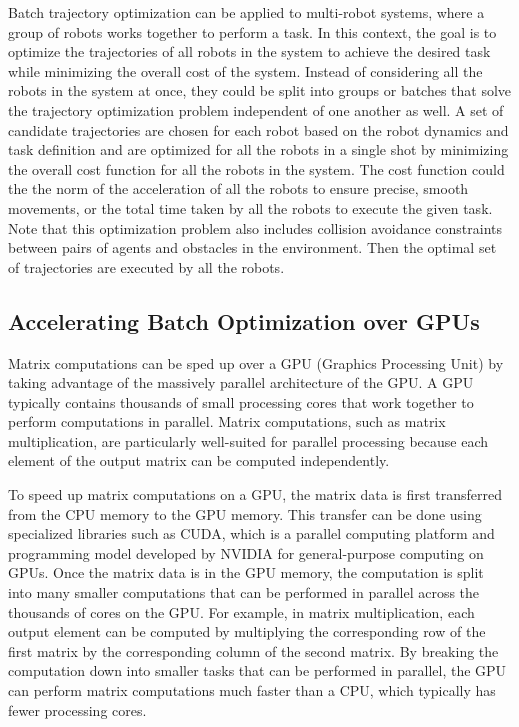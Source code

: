 Batch trajectory optimization can be applied to multi-robot systems, where a group of robots works together to perform a task. In this context, the goal is to optimize the trajectories of all robots in the system to achieve the desired task while minimizing the overall cost of the system. Instead of considering all the robots in the system at once, they could be split into groups or batches that solve the trajectory optimization problem independent of one another as well. A set of candidate trajectories are chosen for each robot based on the robot dynamics and task definition and are optimized for all the robots in a single shot by minimizing the overall cost function for all the robots in the system. The cost function could the the norm of the acceleration of all the robots to ensure precise, smooth movements, or the total time taken by all the robots to execute the given task. Note that this optimization problem also includes collision avoidance constraints between pairs of agents and obstacles in the environment. Then the optimal set of trajectories are executed by all the robots. 

\subsection{Accelerating Batch Optimization over GPUs}

Matrix computations can be sped up over a GPU (Graphics Processing Unit) by taking advantage of the massively parallel architecture of the GPU. A GPU typically contains thousands of small processing cores that work together to perform computations in parallel. Matrix computations, such as matrix multiplication, are particularly well-suited for parallel processing because each element of the output matrix can be computed independently.

To speed up matrix computations on a GPU, the matrix data is first transferred from the CPU memory to the GPU memory. This transfer can be done using specialized libraries such as CUDA, which is a parallel computing platform and programming model developed by NVIDIA for general-purpose computing on GPUs. Once the matrix data is in the GPU memory, the computation is split into many smaller computations that can be performed in parallel across the thousands of cores on the GPU. For example, in matrix multiplication, each output element can be computed by multiplying the corresponding row of the first matrix by the corresponding column of the second matrix. By breaking the computation down into smaller tasks that can be performed in parallel, the GPU can perform matrix computations much faster than a CPU, which typically has fewer processing cores.

